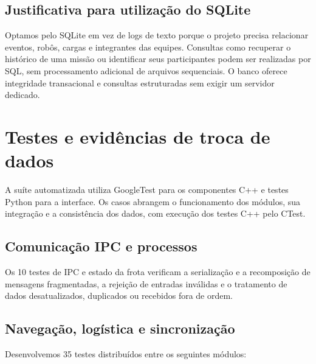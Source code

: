 \documentclass[12pt,a4paper]{article}
\begin{document}
\subsection{Justificativa para utilização do SQLite}

Optamos pelo SQLite em vez de logs de texto porque o projeto precisa relacionar
eventos, robôs, cargas e integrantes das equipes. Consultas como recuperar o
histórico de uma missão ou identificar seus participantes podem ser realizadas
por SQL, sem processamento adicional de arquivos sequenciais. O banco oferece
integridade transacional e consultas estruturadas sem exigir um servidor
dedicado.

\section{Testes e evidências de troca de dados}

A suíte automatizada utiliza GoogleTest para os componentes C++ e testes Python
para a interface. Os casos abrangem o funcionamento dos módulos, sua integração
e a consistência dos dados, com execução dos testes C++ pelo CTest.

\subsection{Comunicação IPC e processos}

Os 10 testes de IPC e estado da frota verificam a serialização e a recomposição
de mensagens fragmentadas, a rejeição de entradas inválidas e o tratamento de
dados desatualizados, duplicados ou recebidos fora de ordem.

\subsection{Navegação, logística e sincronização}

Desenvolvemos 35 testes distribuídos entre os seguintes módulos:
\end{document}
